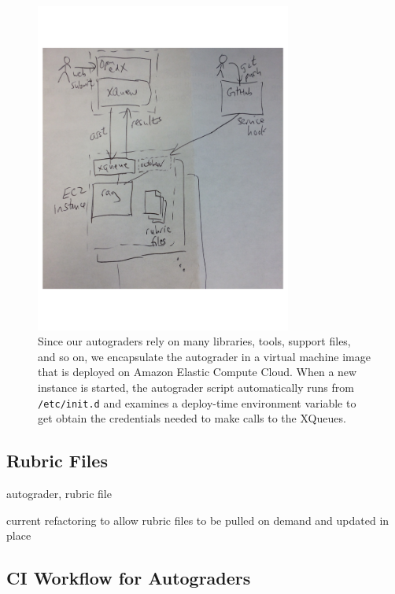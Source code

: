 \begin{figure}
  \centering
  \includegraphics[width=0.75\textwidth]{figs/autograder_arch.pdf}
  \caption{\label{fig:arch}
  Since our autograders rely on many libraries,
  tools, support files, and so on, we encapsulate the autograder in a
  virtual machine image that is deployed on Amazon Elastic Compute Cloud.
  When a new instance is started, the autograder script automatically runs from
  \texttt{/etc/init.d} and examines a deploy-time environment variable
  to get obtain the credentials needed to make calls to the XQueues.}
\end{figure}


\subsection{Rubric Files}

autograder, rubric file

current refactoring to allow rubric files to be pulled on demand and
updated in place

\subsection{CI Workflow for Autograders}




